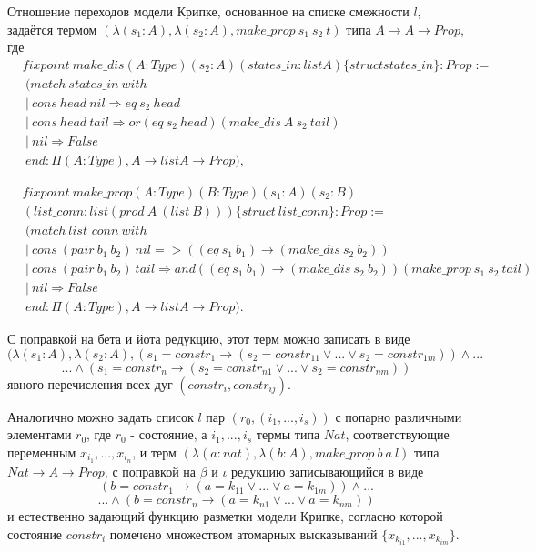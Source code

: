 \documentclass[12pt]{article}
\begin{document}
Отношение переходов модели Крипке, основанное на списке смежности $l$, задаётся термом $(\lambda (s_1:A), \lambda (s_2:A), make\_prop\ s_1\ s_2\ t)$ типа $A \xrightarrow{} A \xrightarrow{} Prop$, где
\begin{align*}
& fixpoint\ make\_dis(A:Type) (s_2:A)(states\_in: list A)\{struct states\_in\}: Prop := \\
&\  (match\ states\_in\ with \\
&\ |\ cons\ head\ nil \Rightarrow eq\ s_2\ head \\
&\ |\ cons\ head\ tail  \Rightarrow or (eq\ s_2\ head) (make\_dis\ A\ s_2\ tail) \\
&\ |\ nil \Rightarrow False \\
&\ end: \Pi( A : Type), A \xrightarrow{} list A \xrightarrow{} Prop),
\end{align*}

\begin{align*}
& fixpoint\ make\_prop(A:Type)(B:Type) (s_1:A)(s_2:B)\\ 
& (list\_conn: list (prod\ A\ (list\ B))) \{struct\ list\_conn\}: Prop := \\
&\  (match\ list\_conn\ with \\
&\ |\ cons\ (pair\ b_1\ b_2)\ nil => ((eq\ s_1\ b_1) \xrightarrow{} (make\_dis\ s_2\ b_2)) \\
&\ |\ cons\ (pair\ b_1\ b_2)\ tail  \Rightarrow and ((eq\ s_1\ b_1) \xrightarrow{} (make\_dis\ s_2\ b_2)) (make\_prop\ s_1\ s_2\ tail) \\
&\ |\ nil \Rightarrow False \\
&\ end: \Pi (A : Type), A \xrightarrow{} list A \xrightarrow{} Prop).
\end{align*}

С поправкой на бета и йота редукцию, этот терм можно записать в виде
$$(\lambda (s_1:A), \lambda (s_2:A), (s_1=constr_1 \xrightarrow{} (s_2=constr_{11} \vee ... \vee s_2=constr_{1m})) \wedge ... $$
$$... \wedge (s_1=constr_n \xrightarrow{} (s_2=constr_{n1} \vee ... \vee s_2=constr_{nm}))$$
явного перечисления всех дуг $(constr_i, constr_{ij})$.

Аналогично можно задать список $l$ пар $(r_0, (i_1, ..., i_s))$  с попарно различными элементами $r_0$, где $r_0$ - состояние, а $i_1,...,i_s$ термы типа $Nat$, соответствующие переменным $x_{i_1},...,x_{i_n}$, и терм $(\lambda (a:nat), \lambda  (b:A), make\_prop\ b\ a\ l)$ типа $Nat \xrightarrow{} A \xrightarrow{} Prop$, с поправкой на $\beta$ и $\iota$ редукцию записывающийся в виде 
$$(b=constr_1 \xrightarrow{} (a=k_{11} \vee ... \vee a=k_{1m})) \wedge ... $$
$$... \wedge (b=constr_n \xrightarrow{} (a=k_{n1} \vee ... \vee a=k_{nm}))$$
и естественно задающий функцию разметки модели Крипке, согласно которой состояние $constr_i$ помечено множеством атомарных высказываний $\{x_{k_{i1}},...,x_{k_{im}}\}$.
\end{document}
